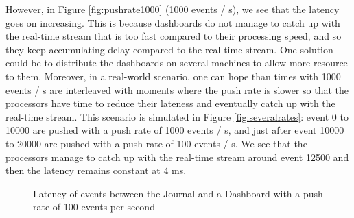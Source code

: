 However, in Figure \ref{fig:pushrate1000} (1000 events / s), we see that the latency goes on increasing. This is because dashboards do not manage to catch up with the real-time stream that is too fast compared to their processing speed, and so they keep accumulating delay compared to the real-time stream. One solution could be to distribute the dashboards on several machines to allow more resource to them. Moreover, in a real-world scenario, one can hope than times with 1000 events / s are interleaved with moments where the push rate is slower so that the processors have time to reduce their lateness and eventually catch up with the real-time stream. This scenario is simulated in Figure \ref{fig:severalrates}: event 0 to 10000 are pushed with a push rate of 1000 events / s, and just after event 10000 to 20000 are pushed with a push rate of 100 events / s. We see that the processors manage to catch up with the real-time stream around event 12500 and then the latency remains constant at 4 ms.
\\

\begin{figure}
  \begin{center} 
    \caption{Latency of events between the Journal and a Dashboard with a push rate of 100 events per second}
    \label{fig:pushrate100}
  \end{center}
\end{figure}

